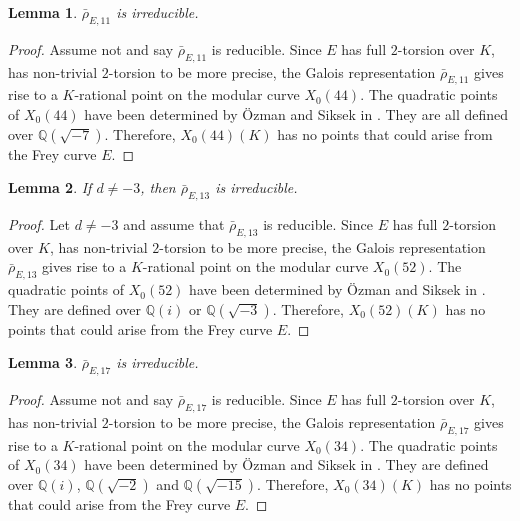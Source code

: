\documentclass[]{article}
\newtheorem{lemma}{Lemma}
\newcommand {\QQ}{{\mathbb{Q}}}
\begin{document}
\begin{lemma}\label{irred11}
  $\bar{\rho}_{E, 11}$ is irreducible.  
\end{lemma}

\begin{proof}
Assume not and say $\bar{\rho}_{E, 11}$ is reducible. Since $E$ has full $2$-torsion over $K$, has non-trivial $2$-torsion to be more precise, the Galois representation $\bar{\rho}_{E, 11}$ gives rise to a $K$-rational point on the modular curve $X_0(44)$. The quadratic points of $X_0(44)$ have been determined by \"{O}zman and Siksek in \cite[Table 8.4]{ozman2019quadratic}. They are all defined over $\QQ(\sqrt{-7})$. Therefore, $X_0(44)(K)$ has no points that could arise from the Frey curve $E$.  
\end{proof}

\begin{lemma}\label{irred13}
    If $d\ne -3$, then $\bar{\rho}_{E, 13}$ is irreducible.
\end{lemma}

\begin{proof}
    Let $d\ne -3$ and assume that $\bar{\rho}_{E, 13}$ is reducible. Since $E$ has full $2$-torsion over $K$, has non-trivial $2$-torsion to be more precise, the Galois representation $\bar{\rho}_{E, 13}$ gives rise to a $K$-rational point on the modular curve $X_0(52)$. The quadratic points of $X_0(52)$ have been determined by \"{O}zman and Siksek in \cite[Table 8.7]{ozman2019quadratic}. They are defined over $\QQ(i)$ or $\QQ(\sqrt{-3})$. Therefore, $X_0(52)(K)$ has no points that could arise from the Frey curve $E$.
\end{proof}

\begin{lemma}\label{irred17}
  $\bar{\rho}_{E, 17}$ is irreducible.  
\end{lemma}

\begin{proof}
    Assume not and say $\bar{\rho}_{E, 17}$ is reducible. Since $E$ has full $2$-torsion over $K$, has non-trivial $2$-torsion to be more precise, the Galois representation $\bar{\rho}_{E, 17}$ gives rise to a $K$-rational point on the modular curve $X_0(34)$. The quadratic points of $X_0(34)$ have been determined by \"{O}zman and Siksek in \cite[Table 8.1]{ozman2019quadratic}. They are defined over $\QQ(i)$, $\QQ(\sqrt{-2})$ and $\QQ(\sqrt{-15})$. Therefore, $X_0(34)(K)$ has no points that could arise from the Frey curve $E$.
\end{proof}
\end{document}
